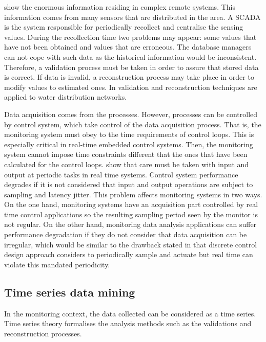 \textcite{quevedo10} show the enormous information residing in complex remote systems. This information comes from many sensors that are distributed in the area. A SCADA is the system responsible for periodically recollect and centralise the sensing values. During the recollection time two problems may appear: some values that have not been obtained and values that are erroneous. The database managers can not cope with such data as the historical information would be inconsistent. Therefore, a validation process must be taken in order to assure that stored data is correct. If data is invalid, a reconstruction process may take place in order to modify values to estimated ones. In \cite{quevedo10} validation and reconstruction techniques are applied to water distribution networks. 





 
Data acquisition comes from the processes. However, processes can be controlled by control system, which take control of the data acquisition process. That is, the monitoring system must obey to the time requirements of control loops. This is especially critical in real-time embedded control systems. Then, the monitoring system cannot impose time constraints different that the ones that have been calculated for the control loops. \textcite{lozoya08} show that care must be taken with input and output at periodic tasks in real time systems. Control system performance degrades if it is not considered that input and output operations are subject to sampling and latency jitter. This problem affects monitoring systems in two ways. On the one hand, monitoring systems  have an acquisition part controlled by real time control applications so the resulting sampling period seen by the monitor is not regular. On the other hand, monitoring data analysis applications can suffer performance degradation if they do not consider that data acquisition can be irregular, which would be similar to the drawback stated in \cite{lozoya08} that discrete control design approach considers to periodically sample and actuate but real time can violate this mandated periodicity.




\subsection{Time series data mining}

In the monitoring context, the data collected can be considered as a time
series.  Time series theory formalises the analysis methods such as the validations and reconstruction processes.

